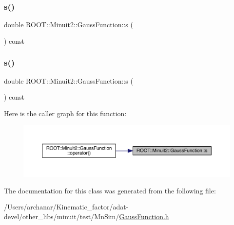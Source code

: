 \subsubsection{\texorpdfstring{s()}{s()}\hspace{0.1cm}{\footnotesize\ttfamily [1/2]}}
{\footnotesize\ttfamily double R\+O\+O\+T\+::\+Minuit2\+::\+Gauss\+Function\+::s (\begin{DoxyParamCaption}{ }\end{DoxyParamCaption}) const\hspace{0.3cm}{\ttfamily [inline]}}

\mbox{\label{classROOT_1_1Minuit2_1_1GaussFunction_aae78103bd6daf029fdb95d70185803e2}} 
\subsubsection{\texorpdfstring{s()}{s()}\hspace{0.1cm}{\footnotesize\ttfamily [2/2]}}
{\footnotesize\ttfamily double R\+O\+O\+T\+::\+Minuit2\+::\+Gauss\+Function\+::s (\begin{DoxyParamCaption}{ }\end{DoxyParamCaption}) const\hspace{0.3cm}{\ttfamily [inline]}}

Here is the caller graph for this function\+:
\nopagebreak
\begin{figure}[H]
\begin{center}
\leavevmode
\includegraphics[width=350pt]{d7/d62/classROOT_1_1Minuit2_1_1GaussFunction_aae78103bd6daf029fdb95d70185803e2_icgraph}
\end{center}
\end{figure}


The documentation for this class was generated from the following file\+:\begin{DoxyCompactItemize}
\item 
/\+Users/archanar/\+Kinematic\+\_\+factor/adat-\/devel/other\+\_\+libs/minuit/test/\+Mn\+Sim/\mbox{\hyperlink{adat-devel_2other__libs_2minuit_2test_2MnSim_2GaussFunction_8h}{Gauss\+Function.\+h}}\end{DoxyCompactItemize}
